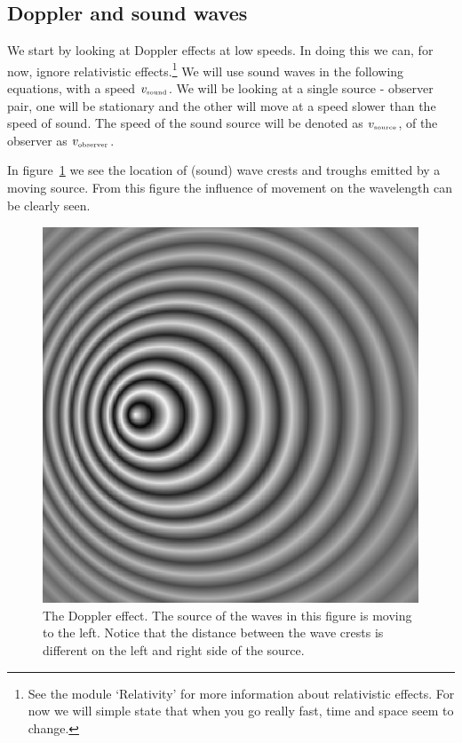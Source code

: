 \documentclass[12pt,a4paper]{article}
\numberwithin{equation}{section}
\numberwithin{figure}{section}
\numberwithin{table}{section}
\begin{document}
\subsection{Doppler and sound waves}
We start by looking at Doppler effects at low speeds. In doing this we can, for now, ignore relativistic effects.\footnote{See the module `Relativity' for more information about relativistic effects. For now we will simple state that when you go really fast, time and space seem to change.} We will use sound waves in the following equations, with a speed $v_{\mbox{\begin{tiny}sound\end{tiny}}}$. We will be looking at a single source - observer pair, one will be stationary and the other will move at a speed slower than the speed of sound. The speed of the sound source will be denoted as $v_{\mbox{\begin{tiny}source\end{tiny}}}$, of the observer as $v_{\mbox{\begin{tiny}observer\end{tiny}}}$. 

In figure~\ref{fig:doppler_1} we see the location of (sound) wave crests and troughs emitted by a moving source. From this figure the influence of movement on the wavelength can be clearly seen.
\begin{figure}[t]\begin{center}
\includegraphics[scale=1]{Doppler_effect.svg.eps}%
\caption{The Doppler effect. The source of the waves in this figure is moving to the left. Notice that the distance between the wave crests is different on the left and right side of the source.}\label{fig:doppler_1}
\end{center}\end{figure}
\end{document}
